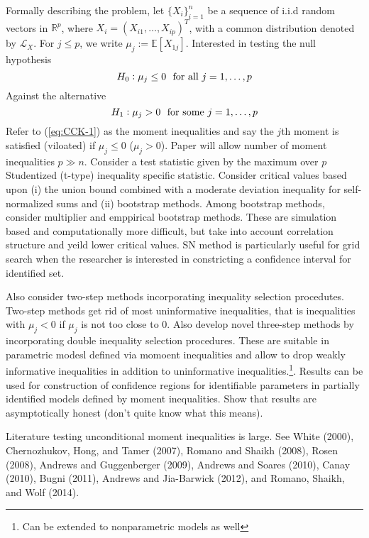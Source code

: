 Formally describing the problem, let $\{X_i\}_{i=1}^n$ be a sequence of i.i.d random vectors in $\mathbb{R}^p$, where $X_i = (X_{i1},\dots,X_{ip})^T$, with a common distribution denoted by $\mathscr{L}_X$. For $j \leq p$, we write $\mu_j := \mathbb{E}[X_{1j}]$. Interested in testing the null hypothesis 
\begin{equation}
	\label{eq:CCK-1}
	H_0 :\mu_j \leq 0\hbox{ }\text{ for all }j = 1,\dots,p
\end{equation}
Against the alternative 
\begin{equation}
	\label{eq:CCK-2}
	H_1: \mu_j > 0 \hbox{ }\text{ for some }j = 1,\dots,p
\end{equation}
Refer to (\ref{eq:CCK-1}) as the moment inequalities and say the $j$th moment is satisfied (viloated) if $\mu_j \leq 0$ ($\mu_j > 0$). Paper will allow number of moment inequalities $p \gg n$. Consider a test statistic given by the maximum over $p$ Studentized (t-type) inequality specific statistic. Consider critical values based upon (i) the union bound combined with a moderate deviation inequality for self-normalized sums and (ii) bootstrap methods. Among bootstrap methods, consider multiplier and emppirical bootstrap methods. These are simulation based and computationally more difficult, but take into account correlation structure and yeild lower critical values. SN method is particularly useful for grid search when the researcher is interested in constricting a confidence interval for identified set. 

Also consider two-step methods incorporating inequality selection procedutes. Two-step methods get rid of most uninformative inequalities, that is inequalities with $\mu_j < 0$ if $\mu_j$ is not too close to 0. Also develop novel three-step methods by incorporating double inequality selection procedures. These are suitable in parametric modesl defined via momoent inequalities and allow to drop weakly informative inequalities in addition to uninformative inequalities.\footnote{Can be extended to nonparametric models as well}. Results can be used for construction of confidence regions for identifiable parameters in partially identified models defined by moment inequalities. Show that results are asymptotically honest (don't quite know what this means).

Literature testing unconditional moment inequalities is large. See White (2000), Chernozhukov, Hong, and Tamer (2007), Romano and Shaikh (2008), Rosen (2008), Andrews and Guggenberger (2009), Andrews and Soares (2010), Canay (2010), Bugni (2011), Andrews and Jia-Barwick (2012), and Romano, Shaikh, and Wolf (2014). 

